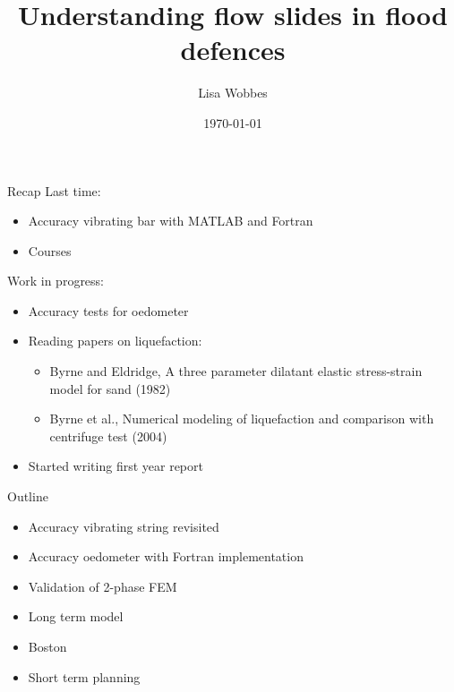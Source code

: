 \documentclass[mathserif,professionalfont,hyperref={pdfpagelabels=false}]{beamer}
\title[]{\normalsize{Understanding flow slides in flood defences}}
\institute[]{}
\author[]{Lisa Wobbes}
\date[\today]{\today}
\begin{document}
{
\frame{\titlepage}
}

\begin{frame}{Recap}
Last time:
\begin{itemize}
\item Accuracy vibrating bar with MATLAB and Fortran
\item Courses 
\end{itemize}
\pause
 Work in progress:
\begin{itemize}
\item Accuracy tests for oedometer
\item Reading papers on liquefaction:
\begin{itemize}
\item Byrne and Eldridge, A three parameter dilatant elastic stress-strain model for sand (1982)
\item Byrne et al., Numerical modeling of liquefaction and comparison with centrifuge test (2004)
\end{itemize}
\item Started writing first year report 
\end{itemize}
\end{frame}
\begin{frame}{Outline}
\begin{itemize}
\item Accuracy vibrating string revisited
\item Accuracy oedometer with Fortran implementation
\item Validation of 2-phase FEM
\item Long term model
\item Boston
\item Short term planning
\end{itemize}
\end{frame}

\end{document}
